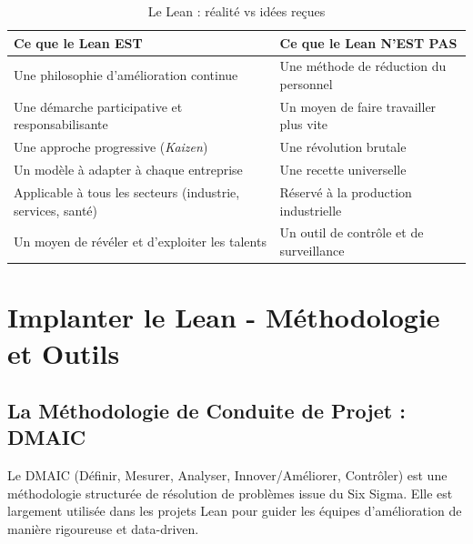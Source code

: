\documentclass[a4paper,12pt]{article}
\begin{document}
\begin{table}[h!]
\centering
\begin{tabular}{|p{5cm}|p{5cm}|}
\hline
\textbf{Ce que le Lean EST} & \textbf{Ce que le Lean N'EST PAS} \\
\hline
Une philosophie d'amélioration continue & Une méthode de réduction du personnel \\
\hline
Une démarche participative et responsabilisante & Un moyen de faire travailler plus vite \\
\hline
Une approche progressive (\textit{Kaizen}) & Une révolution brutale \\
\hline
Un modèle à adapter à chaque entreprise & Une recette universelle \\
\hline
Applicable à tous les secteurs (industrie, services, santé) & Réservé à la production industrielle \\
\hline
Un moyen de révéler et d'exploiter les talents & Un outil de contrôle et de surveillance \\
\hline
\end{tabular}
\caption{Le Lean : réalité vs idées reçues}
\label{tab:lean_vs_fake}
\end{table}

\begin{center}
\end{center}
\section{Implanter le Lean - Méthodologie et Outils}

\subsection{La Méthodologie de Conduite de Projet : DMAIC}

Le DMAIC (Définir, Mesurer, Analyser, Innover/Améliorer, Contrôler) est une méthodologie structurée de résolution de problèmes issue du Six Sigma. Elle est largement utilisée dans les projets Lean pour guider les équipes d'amélioration de manière rigoureuse et data-driven.

\begin{center}
\end{center}
\end{document}
